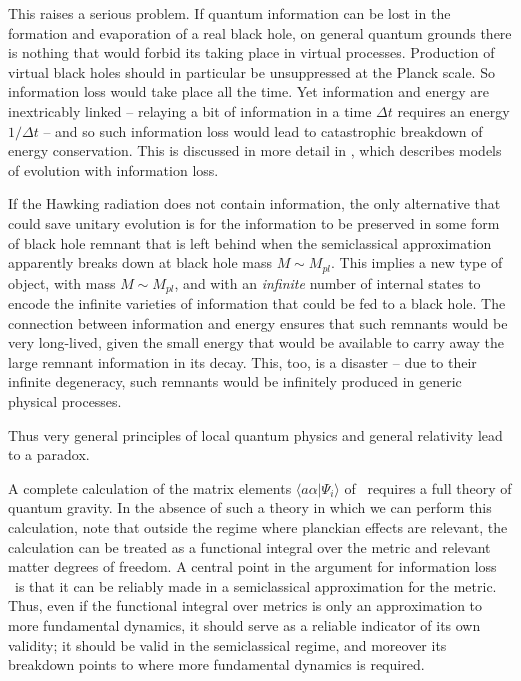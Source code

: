 This raises a serious problem.  If quantum information can be lost in the formation and evaporation of a real black hole, on general quantum grounds there is  nothing that would forbid its taking place in virtual processes.  Production of virtual black holes should in particular be unsuppressed at the Planck scale.  So information loss would take place all the time.  Yet information and energy are inextricably linked -- relaying a bit of information in a time $\Delta t$ requires an energy $1/\Delta t$ -- and so such information loss would lead to catastrophic breakdown of energy conservation.  This is discussed in more detail in , which describes models of evolution with information loss.

If the Hawking radiation does not contain information, the only alternative that could save unitary evolution is for the information to be preserved in some form of black hole remnant that is left behind when the semiclassical approximation apparently breaks down at black hole mass $M\sim M_{pl}$.  This implies a new type of object, with mass $M\sim M_{pl}$, and with an {\it infinite} number of internal states to encode the infinite varieties of information that could be fed to a black hole.  The connection between information and energy ensures that such remnants would be very long-lived, given the small energy that would be available to carry away the large remnant information in its decay.
This, too, is a disaster -- due to their infinite degeneracy, such remnants would be infinitely produced in generic physical processes.

Thus very general principles of local quantum physics and general relativity lead to a paradox.



A complete calculation of the matrix elements $\langle a\alpha |\Psi_i\rangle$ of \Hawkstate\ requires a full theory of quantum gravity.  In the absence of such a theory in which we can perform this calculation, note that outside the regime where planckian effects are relevant, the calculation can be treated as a functional integral over the metric and relevant matter degrees of freedom.  A central point in the argument for information loss \Hawkunc\  is that it can be reliably made in a semiclassical approximation for the metric.  Thus, even if the functional integral over metrics is only an approximation to more fundamental dynamics, it should serve as a reliable indicator of its own validity; it should be valid in the semiclassical regime, and moreover its breakdown points to where more fundamental dynamics is required.


